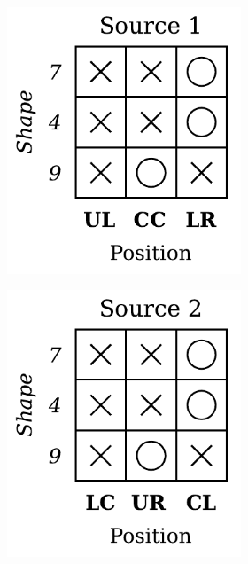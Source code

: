 \begin{dataset}
\begin{figure}[H]
\begin{subfigure}[b]{0.45\textwidth}
\begin{subfigure}[b]{0.48\textwidth}
                \includegraphics[width=\textwidth]{img/datasets/3-CGO_fact=pos_env=0.pdf}
            \end{subfigure}
            \begin{subfigure}[b]{0.48\textwidth}
                \centering
                \includegraphics[width=\textwidth]{img/datasets/3-CGO_fact=pos_env=1.pdf}

\end{subfigure}
\end{subfigure}
\end{figure}
\end{dataset}
